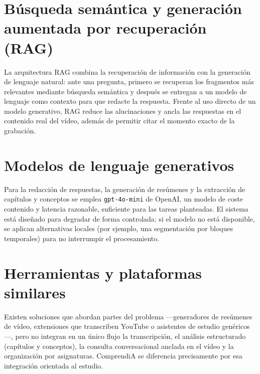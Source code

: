 \section{Búsqueda semántica y generación aumentada por recuperación (RAG)}

La arquitectura RAG \cite{lewis2020rag} combina la recuperación de información con la generación
de lenguaje natural: ante una pregunta, primero se recuperan los fragmentos más relevantes
mediante búsqueda semántica y después se entregan a un modelo de lenguaje como contexto para que
redacte la respuesta. Frente al uso directo de un modelo generativo, RAG reduce las alucinaciones
y ancla las respuestas en el contenido real del vídeo, además de permitir citar el momento exacto
de la grabación.

\section{Modelos de lenguaje generativos}

Para la redacción de respuestas, la generación de resúmenes y la extracción de capítulos y
conceptos se emplea \texttt{gpt-4o-mini} de OpenAI, un modelo de coste contenido y latencia
razonable, suficiente para las tareas planteadas. El sistema está diseñado para degradar de
forma controlada: si el modelo no está disponible, se aplican alternativas locales (por ejemplo,
una segmentación por bloques temporales) para no interrumpir el procesamiento.

\section{Herramientas y plataformas similares}

Existen soluciones que abordan partes del problema —generadores de resúmenes de vídeo,
extensiones que transcriben YouTube o asistentes de estudio genéricos—, pero no integran en un
único flujo la transcripción, el análisis estructurado (capítulos y conceptos), la consulta
conversacional anclada en el vídeo y la organización por asignaturas. ComprendiA se diferencia
precisamente por esa integración orientada al estudio.
